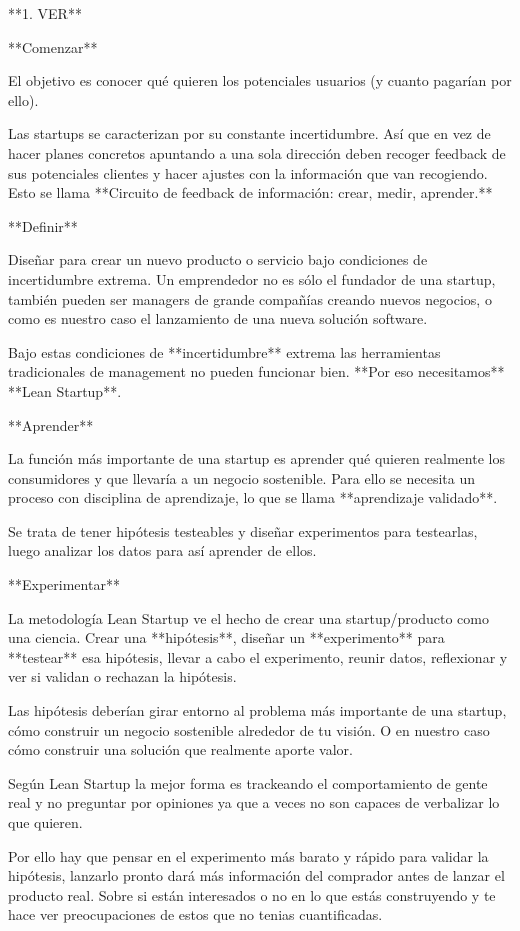 \documentclass[12pt,twoside,titlepage]{report}
\begin{document}
**1. VER**

**Comenzar**

El objetivo es conocer qué quieren los potenciales usuarios (y cuanto pagarían por ello). 

Las startups se caracterizan por su constante incertidumbre. Así que en vez de hacer planes concretos apuntando a una sola dirección deben recoger feedback de sus potenciales clientes y hacer ajustes con la información que van recogiendo. Esto se llama **Circuito de feedback de información: crear, medir, aprender.** 

**Definir**

Diseñar para crear un nuevo producto o servicio bajo condiciones de incertidumbre extrema. Un emprendedor no es sólo el fundador de una startup, también pueden ser managers de grande compañías creando nuevos negocios, o como es nuestro caso el lanzamiento de una nueva solución software.

Bajo estas condiciones de **incertidumbre** extrema las herramientas tradicionales de management no pueden funcionar bien. **Por eso necesitamos** **Lean Startup**.

**Aprender**

La función más importante de una startup es aprender qué quieren realmente los consumidores y que llevaría a un negocio sostenible. Para ello se necesita un proceso con disciplina de aprendizaje, lo que se llama **aprendizaje validado**. 

Se trata de tener hipótesis testeables y diseñar experimentos para testearlas, luego analizar los datos para así aprender de ellos.

**Experimentar**

La metodología Lean Startup ve el hecho de crear una startup/producto como una ciencia. Crear una **hipótesis**, diseñar un **experimento** para **testear** esa hipótesis, llevar a cabo el experimento, reunir datos, reflexionar y ver si validan o rechazan la hipótesis.

Las hipótesis deberían girar entorno al problema más importante de una startup, cómo construir un negocio sostenible alrededor de tu visión. O en nuestro caso cómo construir una solución que realmente aporte valor.

Según Lean Startup la mejor forma es trackeando el comportamiento de gente real y no preguntar por opiniones ya que a veces no son capaces de verbalizar lo que quieren.

Por ello hay que pensar en el experimento más barato y rápido para validar la hipótesis, lanzarlo pronto dará más información del comprador antes de lanzar el producto real. Sobre si están interesados o no en lo que estás construyendo y te hace ver preocupaciones de estos que no tenias cuantificadas.
\end{document}
